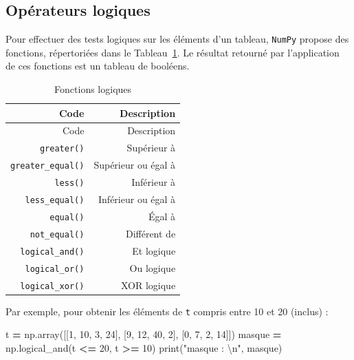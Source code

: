 \documentclass[
  12pt,
]{book}
\newenvironment{Shaded}{\begin{snugshade}}{\end{snugshade}}
\newcommand{\BuiltInTok}[1]{#1}
\newcommand{\CharTok}[1]{\textcolor[rgb]{0.31,0.60,0.02}{#1}}
\newcommand{\DecValTok}[1]{\textcolor[rgb]{0.00,0.00,0.81}{#1}}
\newcommand{\NormalTok}[1]{#1}
\newcommand{\OperatorTok}[1]{\textcolor[rgb]{0.81,0.36,0.00}{\textbf{#1}}}
\newcommand{\StringTok}[1]{\textcolor[rgb]{0.31,0.60,0.02}{#1}}
\numberwithin{equation}{section}
\numberwithin{countremarque}{section}
\begin{document}
\subsection{Opérateurs logiques}\label{opuxe9rateurs-logiques}

Pour effectuer des tests logiques sur les éléments d'un tableau, \texttt{NumPy} propose des fonctions, répertoriées dans le Tableau~\ref{tab:numpy-operateurs-logiques}. Le résultat retourné par l'application de ces fonctions est un tableau de booléens.

\begin{longtable}[]{@{}rr@{}}
\caption{\label{tab:numpy-operateurs-logiques} Fonctions logiques}\tabularnewline
\toprule\noalign{}
Code & Description \\
\midrule\noalign{}
\endfirsthead
\toprule\noalign{}
Code & Description \\
\midrule\noalign{}
\endhead
\bottomrule\noalign{}
\endlastfoot
\texttt{greater()} & Supérieur à \\
\texttt{greater\_equal()} & Supérieur ou égal à \\
\texttt{less()} & Inférieur à \\
\texttt{less\_equal()} & Inférieur ou égal à \\
\texttt{equal()} & Égal à \\
\texttt{not\_equal()} & Différent de \\
\texttt{logical\_and()} & Et logique \\
\texttt{logical\_or()} & Ou logique \\
\texttt{logical\_xor()} & XOR logique \\
\end{longtable}

Par exemple, pour obtenir les éléments de \texttt{t} compris entre 10 et 20 (inclus) :

\begin{Shaded}
\begin{Highlighting}[]
\NormalTok{t }\OperatorTok{=}\NormalTok{ np.array([[}\DecValTok{1}\NormalTok{, }\DecValTok{10}\NormalTok{, }\DecValTok{3}\NormalTok{, }\DecValTok{24}\NormalTok{], [}\DecValTok{9}\NormalTok{, }\DecValTok{12}\NormalTok{, }\DecValTok{40}\NormalTok{, }\DecValTok{2}\NormalTok{], [}\DecValTok{0}\NormalTok{, }\DecValTok{7}\NormalTok{, }\DecValTok{2}\NormalTok{, }\DecValTok{14}\NormalTok{]])}
\NormalTok{masque }\OperatorTok{=}\NormalTok{ np.logical\_and(t }\OperatorTok{\textless{}=} \DecValTok{20}\NormalTok{, t }\OperatorTok{\textgreater{}=} \DecValTok{10}\NormalTok{)}
\BuiltInTok{print}\NormalTok{(}\StringTok{"masque : }\CharTok{\textbackslash{}n}\StringTok{"}\NormalTok{, masque)}
\end{Highlighting}
\end{Shaded}
\end{document}
